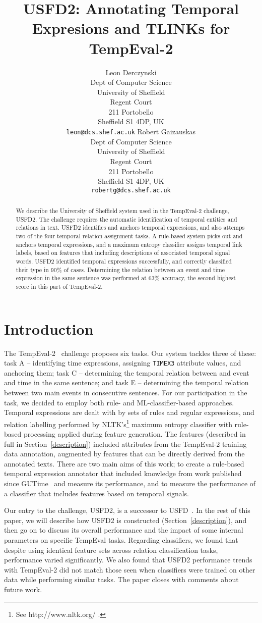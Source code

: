 \documentclass[11pt]{article}
\title{USFD2: Annotating Temporal Expresions and TLINKs for TempEval-2}
\author{Leon Derczynski\\
  Dept of Computer Science\\ 
  University of Sheffield\\ 
  Regent Court\\
  211 Portobello\\ 
  Sheffield S1 4DP, UK\\ 
  {\tt leon@dcs.shef.ac.uk} \And
  Robert Gaizauskas\\
  Dept of Computer Science\\
  University of Sheffield\\
  Regent Court\\
  211 Portobello\\
  Sheffield S1 4DP, UK\\
  {\tt robertg@dcs.shef.ac.uk}
}
\date{}
\begin{document}
\maketitle
\begin{abstract}
We describe the University of Sheffield system used in the TempEval-2 challenge, USFD2. The challenge requires the automatic identification of temporal entities and relations in text. USFD2 identifies and anchors temporal expressions, and also attemps two of the four temporal relation assignment tasks. A rule-based system picks out and anchors temporal expressions, and a maximum entropy classifier assigns temporal link labels, based on features that including descriptions of associated temporal signal words. USFD2 identified temporal expressions successfully, and correctly classified their type in 90\% of cases. Determining the relation between an event and time expression in the same sentence was performed at 63\% accuracy, the second highest score in this part of TempEval-2.
\end{abstract}

\section{Introduction}
The TempEval-2~\cite{pustejovsky2009semeval} challenge proposes six tasks. Our system tackles three of these: task A -- identifying time expressions, assigning {\tt TIMEX3} attribute values, and anchoring them; task C -- determining the temporal relation between and event and time in the same sentence; and task E -- determining the temporal relation between two main events in consecutive sentences. For our participation in the task, we decided to employ both rule- and ML-classifier-based approaches. Temporal expressions are dealt with by sets of rules and regular expressions, and relation labelling performed by NLTK's\footnote{See http://www.nltk.org/ .} maximum entropy classifier with rule-based processing applied during feature generation. The features (described in full in Section~\ref{description}) included attributes from the TempEval-2 training data annotation, augmented by features that can be directly derived from the annotated texts. There are two main aims of this work; to create a rule-based temporal expression annotator that included knowledge from work published since GUTime~\cite{mani2000robust} and measure its performance, and to measure the performance of a classifier that includes features based on temporal signals.

Our entry to the challenge, USFD2, is a successor to USFD~\cite{hepple2007usfd}. In the rest of this paper, we will describe how USFD2 is constructed (Section~\ref{description}), and then go on to discuss its overall performance and the impact of some internal parameters on specific TempEval tasks. Regarding classifiers, we found that despite using identical feature sets across relation classification tasks, performance varied significantly. We also found that USFD2 performance trends with TempEval-2 did not match those seen when classifiers were trained on other data while performing similar tasks. The paper closes with comments about future work.
\end{document}
